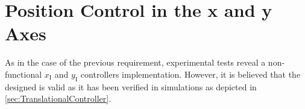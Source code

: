 \section{Position Control in the x and y Axes}
%
As in the case of the previous requirement, experimental tests reveal a non-functional $x_{\mathrm{I}}$ and $y_{\mathrm{I}}$ controllers implementation. However, it is believed that the designed is valid as it has been verified in simulations as depicted in \autoref{sec:TranslationalController}.


%
